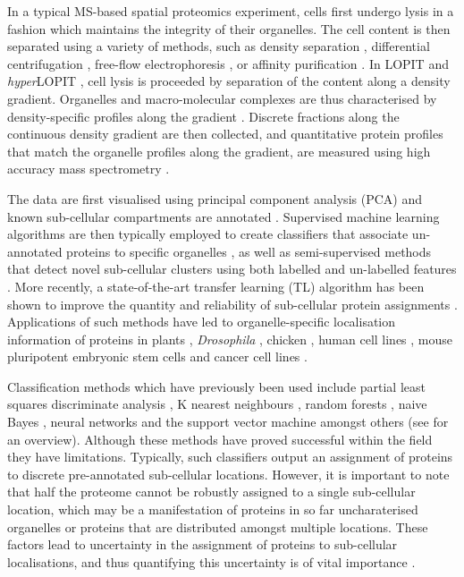 \documentclass[10pt,letterpaper]{article}\usepackage[]{graphicx}\usepackage[]{color}
\begin{document}
In a typical MS-based spatial proteomics experiment, cells first
undergo lysis in a fashion which maintains the integrity of their
organelles. The cell content is then separated using a variety of
methods, such as density separation \cite{Dunkley:2006,hyper},
differential centrifugation \cite{Itzhak:2016}, free-flow
electrophoresis \cite{Parsons:2014}, or affinity purification
\cite{Heard:2015}. In LOPIT \cite{Dunkley:2004, Dunkley:2006,
  Sadowski:2006} and \textit{hyper}LOPIT \cite{hyper,Mulvey:2017}, cell
lysis is proceeded by separation of the content along a density
gradient. Organelles and macro-molecular complexes are thus
characterised by density-specific profiles along the gradient
\cite{DeDuve:1981}.  Discrete fractions along the continuous density
gradient are then collected, and quantitative protein profiles that
match the organelle profiles along the gradient, are measured using
high accuracy mass spectrometry \cite{Mulvey:2017}.

The data are first visualised using principal component analysis (PCA)
and known sub-cellular compartments are annotated
\cite{ghrepo}. Supervised machine learning algorithms are then
typically employed to create classifiers that associate un-annotated
proteins to specific organelles \cite{Gatto:2014b}, as well as
semi-supervised methods that detect novel sub-cellular clusters using
both labelled and un-labelled features \cite{Breckels:2013}. More
recently, a state-of-the-art transfer learning (TL) algorithm has been
shown to improve the quantity and reliability of sub-cellular protein
assignments \cite{Breckels:2016}. Applications of such methods have
led to organelle-specific localisation information of proteins in
plants \cite{Dunkley:2006}, \textit{Drosophila} \cite{Tan:2009},
chicken \cite{hall:2009}, human cell lines \cite{Breckels:2013},
mouse pluripotent embryonic stem cells \cite{hyper} and cancer cell
lines \cite{Thul:2017}.

Classification methods which have previously been used include partial
least squares discriminate analysis \cite{Dunkley:2006}, K nearest
neighbours \cite{Groen::2014}, random forests \cite{Ohta::2010},
naive Bayes \cite{Nikolovski::2012}, neural networks
\cite{Tardif::2012} and the support vector machine amongst others
(see \cite{Gatto:2014b} for an overview). Although these methods have
proved successful within the field they have limitations. Typically,
such classifiers output an assignment of proteins to discrete
pre-annotated sub-cellular locations. However, it is important to note
that half the proteome cannot be robustly assigned to a single
sub-cellular location, which may be a manifestation of proteins in so
far uncharaterised organelles or proteins that are distributed amongst
multiple locations. These factors lead to uncertainty in the
assignment of proteins to sub-cellular localisations, and thus
quantifying this uncertainty is of vital importance \cite{Kirk:2015}.
\end{document}

